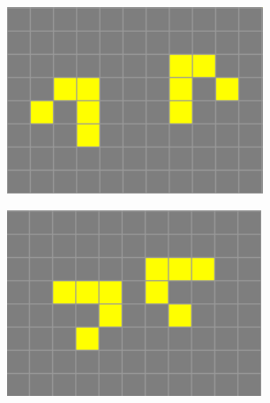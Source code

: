\begin{figure}[b]
    \centering
    \begin{subfigure}{0.22\textwidth}
        \includegraphics[width=\textwidth]{images/life-glider-collission-1.png}
    \end{subfigure}
    \begin{subfigure}{0.22\textwidth}
        \includegraphics[width=\textwidth]{images/life-glider-collission-2.png}
    \end{subfigure}
    \begin{subfigure}{0.22\textwidth}

\end{subfigure}
\end{figure}
